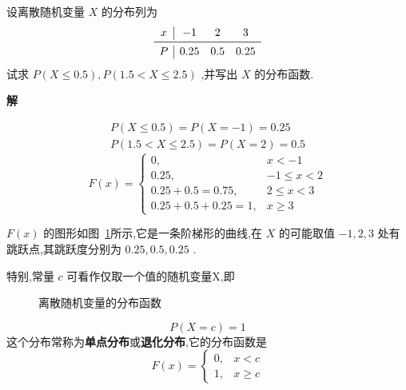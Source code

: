 \begin{example}\label{exam:2.1.4}
	设离散随机变量 $ X $ 的分布列为
	\[ 
	\begin{array}{c|ccc}
	x & -1 & 2 & 3 \\\midrule
	P & 0.25 & 0.5 & 0.25 \\
	\end{array}
	\]	
	试求 $ P(X \leqslant 0.5), P(1.5<X \leqslant 2.5) $ ,并写出 $ X $ 的分布函数.
	
	\textbf{解}
	
	\[ 
	\begin{array}{l}{P(X \leqslant 0.5)=P(X=-1)=0.25} \\ {P(1.5<X \leqslant 2.5)=P(X=2)=0.5}\end{array}
	\]
	\[ 
	F(x)=\left\{\begin{array}{ll}
	{0,} & {x<-1} \\ 
	{0.25,} & {-1 \leqslant x<2} \\ 
	{0.25+0.5=0.75,} & {2 \leqslant x<3} \\ 
	{0.25+0.5+0.25=1,} & {x \geqslant 3}
	\end{array}\right.\]
	
	 $ F(x) $ 的图形如图~\ref{fig:2.1.3}所示,它是一条阶梯形的曲线,在 $ X $ 的可能取值 $ -1,2,3 $ 处有跳跃点,其跳跃度分别为 $ 0.25,0.5,0.25 $ .
	
	
	特别,常量 $ c $ 可看作仅取一个值的随机变量X,即
	
\begin{figure}
    \centering
    \caption{离散随机变量的分布函数}\label{fig:2.1.3}
\end{figure}
	\[ 
	P(X=c)=1
	\]
	这个分布常称为\textbf{单点分布}或\textbf{退化分布},它的分布函数是
	\begin{equation}
	F(x)=\left\{\begin{array}{ll}
	{0,} & {x<c} \\ 
	{1,} & {x \geqslant c}
	\end{array}\right.  \label{eq:2.1.3}
	\end{equation}


\end{example}
